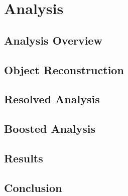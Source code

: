 \chapter{Analysis}
\label{chap:anal}

%
\section{Analysis Overview}

\section{Object Reconstruction}

%
\section{Resolved Analysis}
\label{sec:Resolved}

%
\section{Boosted Analysis}
\label{sec:Boosted}

%
\section{Results}

\section{Conclusion}



